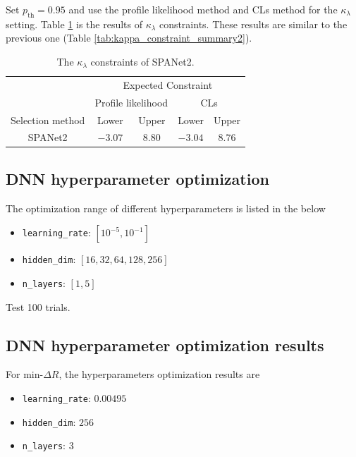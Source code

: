 \documentclass[12pt]{article}
\begin{document}
	Set $p_\text{th} = 0.95$ and use the profile likelihood method and CLs method for the $\kappa_\lambda$ setting. Table \ref{tab:kappa_constraint_SPANet_best_hp} is the results of $\kappa_\lambda$ constraints. These results are similar to the previous one (Table \ref{tab:kappa_constraint_summary2}).
	\begin{table}[htpb]
		\centering
		\caption{The $\kappa_\lambda$ constraints of SPANet2.}
		\label{tab:kappa_constraint_SPANet_best_hp}
		\begin{tabular}{c|cc|cc}
							  & \multicolumn{4}{c}{Expected Constraint}                          \\
							  & \multicolumn{2}{c}{Profile likelihood} & \multicolumn{2}{c}{CLs} \\ \hline
		Selection method      & Lower              & Upper             & Lower      & Upper      \\ \hline
		SPANet2      & $-3.07$            & $8.80$             & $-3.04$      & $8.76$      \\
		\end{tabular}
	\end{table}

	\subsection{DNN hyperparameter optimization}%
	\label{sub:dnn_hyperparameter_optimization}
		The optimization range of different hyperparameters is listed in the below
		\begin{itemize}
			\item \verb+learning_rate+: $[10^{-5}, 10^{-1}]$ 
			\item \verb+hidden_dim+: $[16,32,64,128,256]$ 
			\item \verb+n_layers+: $[1,5]$ 
		\end{itemize}
		Test 100 trials.
	\subsection{DNN hyperparameter optimization results}%
	\label{sub:dnn_hyperparameter_optimization_results}
		For $\text{min-}\Delta R$, the hyperparameters optimization results are 
		\begin{itemize}
			\item \verb+learning_rate+: $0.00495$ 
			\item \verb+hidden_dim+: $256$ 
			\item \verb+n_layers+: $3$ 
		\end{itemize}
		
\end{document}
